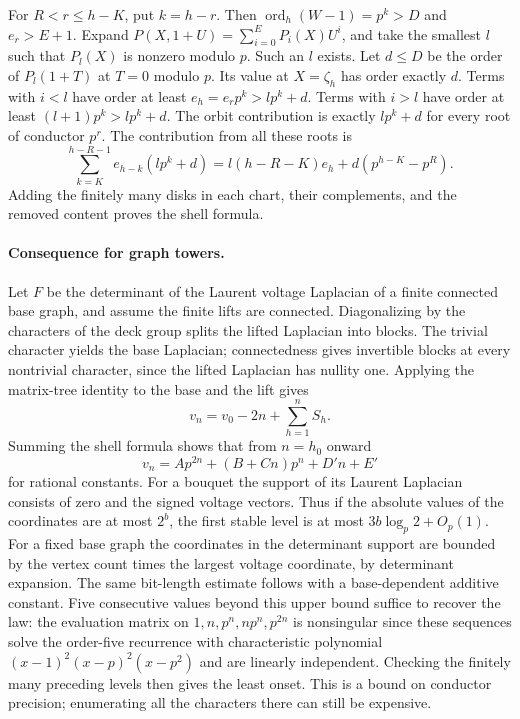 For $R<r\le h-K$, put $k=h-r$. Then
$\operatorname{ord}_h(W-1)=p^k>D$ and $e_r>E+1$.
Expand
$P(X,1+U)=\sum_{i=0}^E P_i(X)U^i$, and take the smallest $l$
such that $P_l(X)$ is nonzero modulo $p$. Such an $l$ exists.
Let $d\le D$ be the order of $P_l(1+T)$ at $T=0$ modulo $p$.
Its value at $X=\zeta_h$ has order exactly $d$. Terms with $i<l$
have order at least $e_h=e_rp^k>lp^k+d$. Terms with $i>l$ have
order at least $(l+1)p^k>lp^k+d$. The orbit contribution is exactly
$lp^k+d$ for every root of conductor $p^r$. The contribution from
all these roots is
\[
 \sum_{k=K}^{h-R-1}e_{h-k}(lp^k+d)
 =l(h-R-K)e_h+d(p^{h-K}-p^R).
\]
Adding the finitely many disks in each chart, their complements,
and the removed content proves the shell formula.

\paragraph{Consequence for graph towers.}
Let $F$ be the determinant of the Laurent voltage Laplacian of a
finite connected base graph, and assume the finite lifts are
connected. Diagonalizing by the characters of the deck group splits
the lifted Laplacian into blocks. The trivial character yields the
base Laplacian; connectedness gives invertible blocks at every
nontrivial character, since the lifted Laplacian has nullity one.
Applying the matrix-tree identity to the base and the lift gives
\[
 v_n=v_0-2n+\sum_{h=1}^{n} S_h .
\]
Summing the shell formula shows that from $n=h_0$ onward
\[
 v_n=A p^{2n}+(B+C n)p^n+D' n+E'
\]
for rational constants. For a bouquet the support of its Laurent
Laplacian consists of zero and the signed voltage vectors. Thus if
the absolute values of the coordinates are at most $2^b$, the
first stable level is at most $3b\log_p 2+O_p(1)$. For a fixed base
graph the coordinates in the determinant support are bounded by
the vertex count times the largest voltage coordinate, by determinant
expansion. The same bit-length estimate follows with a base-dependent
additive constant. Five consecutive values beyond this upper bound
suffice to recover the law: the evaluation matrix on
$1,n,p^n,np^n,p^{2n}$ is nonsingular since these sequences solve the
order-five recurrence with characteristic polynomial
$(x-1)^2(x-p)^2(x-p^2)$ and are linearly independent. Checking the
finitely many preceding levels then gives the least onset. This is a
bound on conductor precision; enumerating all the characters there
can still be expensive.

